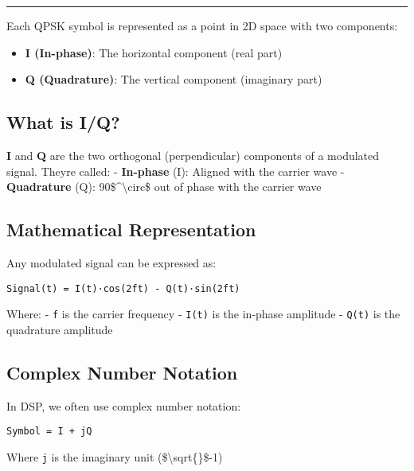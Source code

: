 \begin{center}\rule{0.5\linewidth}{0.5pt}\end{center}

Each QPSK symbol is represented as a point in 2D space with two
components:

\begin{itemize}
\tightlist
\item
  \textbf{I (In-phase)}: The horizontal component (real part)
\item
  \textbf{Q (Quadrature)}: The vertical component (imaginary part)
\end{itemize}

\subsection{What is I/Q?}\label{what-is-iq}

\textbf{I} and \textbf{Q} are the two orthogonal (perpendicular)
components of a modulated signal. They\textquotesingle re called: -
\textbf{In-phase} (I): Aligned with the carrier wave -
\textbf{Quadrature} (Q): 90\$\^{}\textbackslash circ\$ out of phase with
the carrier wave

\subsection{Mathematical
Representation}\label{mathematical-representation}

Any modulated signal can be expressed as:

\begin{verbatim}
Signal(t) = I(t)·cos(2ft) - Q(t)·sin(2ft)
\end{verbatim}

Where: - \texttt{f} is the carrier frequency - \texttt{I(t)} is the
in-phase amplitude - \texttt{Q(t)} is the quadrature amplitude

\subsection{Complex Number Notation}\label{complex-number-notation}

In DSP, we often use complex number notation:

\begin{verbatim}
Symbol = I + jQ
\end{verbatim}

Where \texttt{j} is the imaginary unit (\$\textbackslash sqrt\{\}\$-1)

